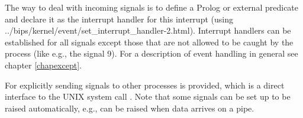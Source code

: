 The way to deal with incoming signals is to define a Prolog or external
predicate and declare it as the interrupt handler for this interrupt
(using
%
{../bips/kernel/event/set_interrupt_handler-2.html}).
Interrupt handlers can be established for all signals except those that are
not allowed to be caught by the process (like e.g., the  signal
9).
For a description of event handling in general see chapter \ref{chapexcept}.

For explicitly sending signals to other processes
 is provided,
which is a direct interface to the UNIX system call .
Note that some signals can be set up to be raised automatically,
e.g.,  can be raised when data arrives on a pipe.


